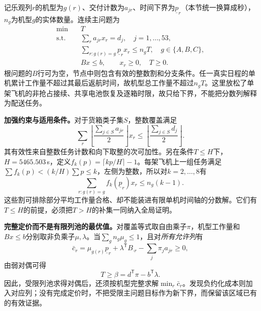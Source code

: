 \documentclass[withoutpreface,colorprint]{format}
\numberwithin{equation}{section}
\numberwithin{figure}{section}
\numberwithin{table}{section}
\begin{document}
记乐观列$r$的机型为$g(r)$、交付计数为$a_{jr}$、时间下界为$\underline p_r$（本节统一换算成秒），$n_g$为机型$g$的实体数量。连续主问题为
\begin{equation}
\begin{aligned}
 \min\quad &T\\
 \mathrm{s.t.}\quad&\sum_ra_{jr}x_r=d_j,\quad j=1,\ldots,53,\\
 &\sum_{r:g(r)=g}\underline p_rx_r\le n_gT,\quad g\in\{A,B,C\},\\
 &Bx\le b,\qquad x_r\ge0,\quad T\ge0.
\end{aligned}
\label{eq:q2_relaxed_master}
\end{equation}
根问题的$B$行可为空，节点中则包含有效的整数割和分支条件。任一真实日程的单机累计工作量不超过其最后返航时间，故机型总工作量不超过$n_gT$。这里放松了单架飞机的非抢占接续、共享电池恢复及逐箱时限，故只给下界，不能把分数列解释为配送任务。

\textbf{加强约束与适用条件。}对于货箱类子集$S$，整数覆盖满足
\begin{equation}
 \sum_r\left\lfloor\frac{\sum_{j\in S}a_{jr}}2\right\rfloor x_r
 \le\left\lfloor\frac{\sum_{j\in S}d_j}2\right\rfloor .
 \label{eq:q2_subset_cut}
\end{equation}
其有效性来自整数任务计数和向下取整的次可加性。另在条件$T\le H$下，$H=5465.503$\,s，定义$f_k(p)=\lceil kp/H\rceil-1$。每架飞机上一组任务满足$\sum f_k(p)<(k/H)\sum p\le k$，左侧为整数，所以对$k=2,\ldots,8$有
\begin{equation}
 \sum_{r:g(r)=g}f_k(\underline p_r)x_r\le n_g(k-1).
 \label{eq:q2_packing_cut}
\end{equation}
这些割可排除部分平均工作量合格、却不能装进有限单机时间轴的分数解。它们有$T\le H$的前提，必须把$T>H$的补集一同纳入全局证明。

\textbf{完整定价而不是有限列池的最优值。}对覆盖等式取自由乘子$\pi$，机型工作量和$Bx\le b$分别取非负乘子$\mu,\lambda$。当$\sum_gn_g\mu_g\le1$，且对\emph{所有允许列}有
\begin{equation}
 \bar c_r=\mu_{g(r)}\underline p_r+\lambda^{\mathsf T}B_{\cdot r}
            -\sum_j\pi_ja_{jr}\ge0,
 \label{eq:q2_pricing_rc}
\end{equation}
由弱对偶可得
\begin{equation}
 T\ge\beta=d^{\mathsf T}\pi-b^{\mathsf T}\lambda.
 \label{eq:q2_dual_bound}
\end{equation}
因此，受限列池求得对偶后，还须按机型完整求解$\min_r\bar c_r$。发现负约化成本则加入对应列；没有完成定价时，不把受限主问题目标作为新下界，而保留该区域已有的有效证据。
\end{document}
